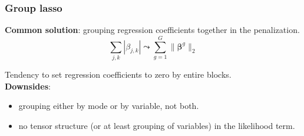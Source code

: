 \documentclass{beamer}
\begin{document}
\begin{frame}
    \frametitle{Group lasso}

 \textbf{Common solution}: grouping regression coefficients together in the penalization.
 $$ \sum\limits_{j,k} |\beta_{j,k}|\leadsto \sum\limits_{g = 1}^G \lVert \bm{\beta}^g \rVert_2 $$

 Tendency to set regression coefficients to zero by entire blocks.\\[10 pt]

\textbf{Downsides}: 
\begin{itemize}
    \item grouping either by mode or by variable, not both.
    \item no tensor structure (or at least grouping of variables) in the likelihood term.\\[5 pt]
\end{itemize}
    

\end{frame}
\end{document}
